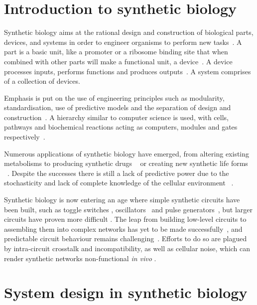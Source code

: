 
\section{Introduction to synthetic biology}

Synthetic biology aims at the rational design and construction of biological parts, devices, and systems in order to engineer organisms to perform new tasks~\autocite{Lu:2009ez, Andrianantoandro:2006bia}. A part is a basic unit, like a promoter or a ribosome binding site that when combined with other parts will make a functional unit, a device~\autocite{Heinemann:2006ht}. A device processes inputs, performs functions and produces outputs~\autocite{Andrianantoandro:2006bia}. A system comprises of a collection of devices.     

Emphasis is put on the use of engineering principles such as modularity, standardisation, use of predictive models and the separation of design and construction~\autocite{Agapakis:2009bt, Heinemann:2006ht}. A hierarchy similar to computer science is used, with cells, pathways and biochemical reactions acting as computers, modules and gates respectively~\autocite{Andrianantoandro:2006bia}. 
       
Numerous applications of synthetic biology have emerged, from altering existing metabolisms to producing synthetic drugs ~\autocite{Holtz:2010bm} or creating new synthetic life forms ~\autocite{Agapakis:2009bt}. Despite the successes there is still a lack of predictive power due to the stochasticity and lack of complete knowledge of the cellular environment ~\autocite{Andrianantoandro:2006bia}.

Synthetic biology is now entering an age where simple synthetic circuits have been built, such as toggle switches \autocite{Gardner:2000vha, Kramer:2004kq, Isaacs:2003ht, Ham:2008hh, Deans:2007cya, Friedland:2009ce}, oscillators~\autocite{Stricker:2008jqa, Fung:2005jd, Tigges:2009jx} and pulse generators~\autocite{Basu:2004gn}, but larger circuits have proven more difficult \autocite{XXX}. The leap from building low-level circuits to assembling them into complex networks has yet to be made successfully~\autocite{Lu:2009ez}, and predictable circuit behaviour remains challenging~\autocite{XXX}. Efforts to do so are plagued by intra-circuit crosstalk and incompatibility, as well as cellular noise, which can render synthetic networks non-functional \textit{in vivo} \autocite{XXX}. 

\section{System design in synthetic biology}

